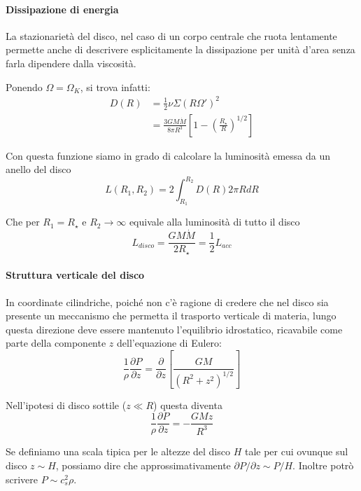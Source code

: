 \documentclass[a4paperbi]{article}
\begin{document}
	\paragraph{Dissipazione di energia}
	La stazionarietà del disco, nel caso di un corpo centrale che ruota lentamente permette anche di descrivere esplicitamente la dissipazione per unità d'area senza farla dipendere dalla viscosità. 
	
	Ponendo $\Omega=\Omega_K$, si trova infatti:
	\begin{align}
		D(R)&=\frac{1}{2}\nu\Sigma(R\Omega')^2
			\\&=\frac{3GM\dot{M}}{8\pi R^3}\left[1-\left(\frac{R_{\star}}{R}\right)^{1/2}\right]
	\end{align}	
	
	Con questa funzione siamo in grado di calcolare la luminosità emessa da un anello del disco
	\begin{equation}
		L(R_1,R_2)=2\int_{R_1}^{R_2}D(R)2\pi RdR
	\end{equation}
	
	Che per $R_1=R_{\star}$ e $R_2\to\infty$ equivale alla luminosità di tutto il disco
	\begin{equation}
		L_{disco}=\frac{GM\dot{M}}{2R_{\star}}=\frac{1}{2}L_{acc}
	\end{equation}
	
	\paragraph{Struttura verticale del disco}
	In coordinate cilindriche, poiché non c'è ragione di credere che nel disco sia presente un meccanismo che permetta il trasporto verticale di materia, lungo questa direzione deve essere mantenuto l'equilibrio idrostatico, ricavabile come parte della componente $z$ dell'equazione di Eulero:
	\begin{equation*}
		\frac{1}{\rho}\frac{\partial P}{\partial z}=\frac{\partial}{\partial z}\left[\frac{GM}{(R^2+z^2)^{1/2}}\right]
	\end{equation*}
	
	Nell'ipotesi di disco sottile ($z\ll R$) questa diventa
	\begin{equation}
		\frac{1}{\rho}\frac{\partial P}{\partial z}=-\frac{GMz}{R^3}
	\end{equation}
	
	Se definiamo una scala tipica per le altezze del disco $H$ tale per cui ovunque sul disco $z\sim H$, possiamo dire che approssimativamente $\partial P/\partial z\sim P/H$. Inoltre potrò scrivere $P\sim c_s^2\rho$.
\end{document}
